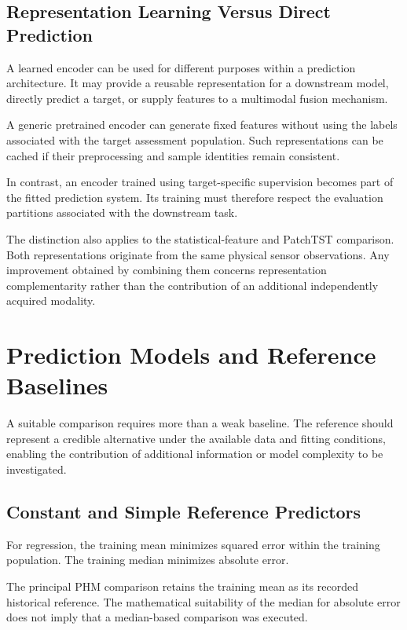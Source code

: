\subsection{Representation Learning Versus Direct Prediction}

A learned encoder can be used for different purposes within a prediction architecture. It may provide a reusable representation for a downstream model, directly predict a target, or supply features to a multimodal fusion mechanism.

A generic pretrained encoder can generate fixed features without using the labels associated with the target assessment population. Such representations can be cached if their preprocessing and sample identities remain consistent.

In contrast, an encoder trained using target-specific supervision becomes part of the fitted prediction system. Its training must therefore respect the evaluation partitions associated with the downstream task.

The distinction also applies to the statistical-feature and PatchTST comparison. Both representations originate from the same physical sensor observations. Any improvement obtained by combining them concerns representation complementarity rather than the contribution of an additional independently acquired modality.

\section{Prediction Models and Reference Baselines}

A suitable comparison requires more than a weak baseline. The reference should represent a credible alternative under the available data and fitting conditions, enabling the contribution of additional information or model complexity to be investigated.

\subsection{Constant and Simple Reference Predictors}

For regression, the training mean minimizes squared error within the training population. The training median minimizes absolute error.

The principal PHM comparison retains the training mean as its recorded historical reference. The mathematical suitability of the median for absolute error does not imply that a median-based comparison was executed.


